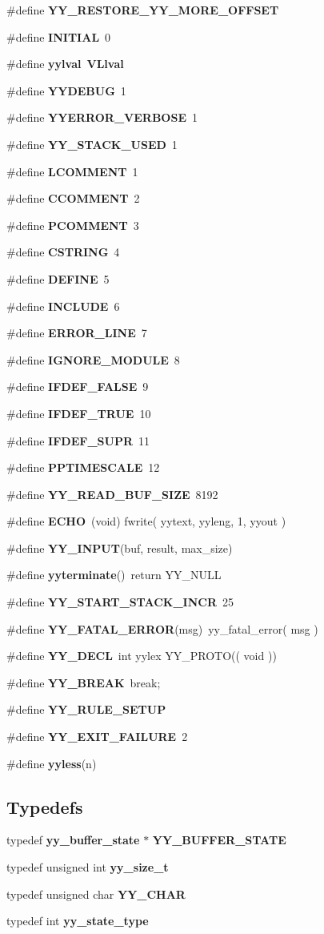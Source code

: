 \begin{CompactItemize}
\item 
\#define {\bf YY\_\-RESTORE\_\-YY\_\-MORE\_\-OFFSET}
\item 
\#define {\bf INITIAL}\ 0
\item 
\#define {\bf yylval}\ {\bf VLlval}
\item 
\#define {\bf YYDEBUG}\ 1
\item 
\#define {\bf YYERROR\_\-VERBOSE}\ 1
\item 
\#define {\bf YY\_\-STACK\_\-USED}\ 1
\item 
\#define {\bf LCOMMENT}\ 1
\item 
\#define {\bf CCOMMENT}\ 2
\item 
\#define {\bf PCOMMENT}\ 3
\item 
\#define {\bf CSTRING}\ 4
\item 
\#define {\bf DEFINE}\ 5
\item 
\#define {\bf INCLUDE}\ 6
\item 
\#define {\bf ERROR\_\-LINE}\ 7
\item 
\#define {\bf IGNORE\_\-MODULE}\ 8
\item 
\#define {\bf IFDEF\_\-FALSE}\ 9
\item 
\#define {\bf IFDEF\_\-TRUE}\ 10
\item 
\#define {\bf IFDEF\_\-SUPR}\ 11
\item 
\#define {\bf PPTIMESCALE}\ 12
\item 
\#define {\bf YY\_\-READ\_\-BUF\_\-SIZE}\ 8192
\item 
\#define {\bf ECHO}\ (void) fwrite( yytext, yyleng, 1, yyout )
\item 
\#define {\bf YY\_\-INPUT}(buf, result, max\_\-size)
\item 
\#define {\bf yyterminate}()\ return YY\_\-NULL
\item 
\#define {\bf YY\_\-START\_\-STACK\_\-INCR}\ 25
\item 
\#define {\bf YY\_\-FATAL\_\-ERROR}(msg)\ yy\_\-fatal\_\-error( msg )
\item 
\#define {\bf YY\_\-DECL}\ int yylex YY\_\-PROTO(( void ))
\item 
\#define {\bf YY\_\-BREAK}\ break;
\item 
\#define {\bf YY\_\-RULE\_\-SETUP}
\item 
\#define {\bf YY\_\-EXIT\_\-FAILURE}\ 2
\item 
\#define {\bf yyless}(n)
\end{CompactItemize}
\subsection*{Typedefs}
\begin{CompactItemize}
\item 
typedef {\bf yy\_\-buffer\_\-state} $\ast$ {\bf YY\_\-BUFFER\_\-STATE}
\item 
typedef unsigned int {\bf yy\_\-size\_\-t}
\item 
typedef unsigned char {\bf YY\_\-CHAR}
\item 
typedef int {\bf yy\_\-state\_\-type}
\end{CompactItemize}
